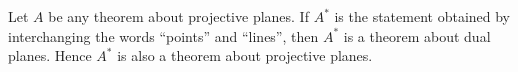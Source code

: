 Let $A$ be any theorem about projective planes. If $A^*$ is the statement obtained by interchanging the words ``points'' and ``lines'', then $A^*$ is a theorem about dual planes. Hence $A^*$ is also a theorem about projective planes.
